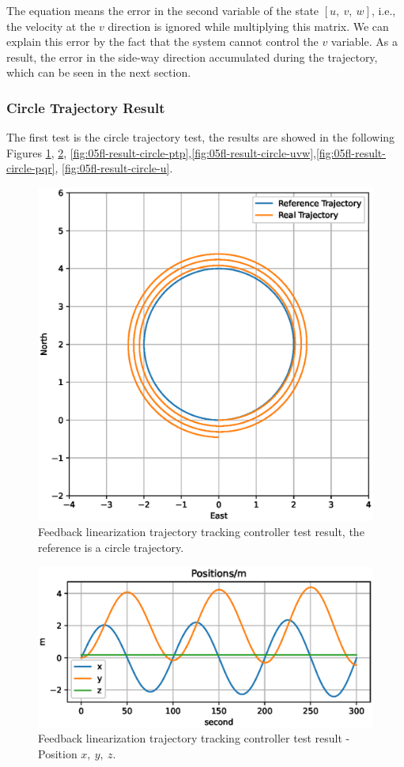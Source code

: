 The equation means the error in the second variable of the state $[u,\ v,\ w]$, i.e., the velocity at the $v$ direction is ignored while multiplying this matrix. We can explain this error by the fact that the system cannot control the $v$ variable. As a result, the error in the side-way direction accumulated during the trajectory, which can be seen in the next section.

\subsubsection{Circle Trajectory Result}

The first test is the circle trajectory test, the results are showed in the following Figures \ref{fig:05fl-result-circle}, \ref{fig:05fl-result-circle-xyz}, \ref{fig:05fl-result-circle-ptp},\ref{fig:05fl-result-circle-uvw},\ref{fig:05fl-result-circle-pqr}, \ref{fig:05fl-result-circle-u}. 

\begin{figure}[H]
    \centering
    \includegraphics[width=.5\textwidth]{images/05fl-result-circle.eps}
    \caption{Feedback linearization trajectory tracking controller test result, the reference is a circle trajectory.}
    \label{fig:05fl-result-circle}
\end{figure}

\begin{figure}[H]
    \centering
    \includegraphics[width=.8\textwidth]{images/05fl-result-circle-xyz.eps}
    \caption{Feedback linearization trajectory tracking controller test result - Position $x,\ y,\ z$.}
    \label{fig:05fl-result-circle-xyz}
\end{figure}

